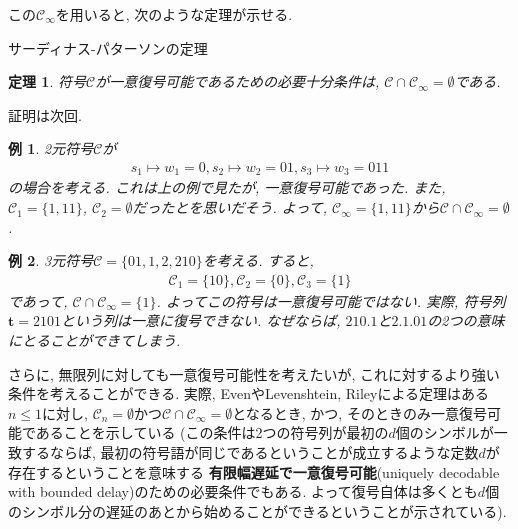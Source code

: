 \documentclass[12pt]{ltjsarticle}
\newtheorem{example}{例}
\newtheorem{theorem}{定理}
\begin{document}
この$\mathcal{C}_\infty$を用いると, 次のような定理が示せる.
\begin{itembox}[l]{サーディナス-パターソンの定理}
  \begin{theorem}
    符号$\mathcal{C}$が一意復号可能であるための必要十分条件は, $\mathcal{C} \cap \mathcal{C}_\infty = \emptyset$である.
  \end{theorem}
\end{itembox}
証明は次回.
\begin{example}
  2元符号$\mathcal{C}$が
  \begin{align*}
    s_1 \mapsto w_1 = 0, s_2 \mapsto w_2 = 01, s_3 \mapsto w_3 = 011
  \end{align*}
  の場合を考える.
  これは上の例で見たが, 一意復号可能であった.
  また, $\mathcal{C}_1 = \{1, 11\}$, $\mathcal{C}_2 = \emptyset$だったとを思いだそう.
  よって, $\mathcal{C}_\infty = \{1, 11\}$から$\mathcal{C} \cap \mathcal{C}_\infty = \emptyset$.
\end{example}
\begin{example}
  3元符号$\mathcal{C} = \{01, 1, 2, 210\}$を考える.
  すると,
  \begin{align*}
    \mathcal{C}_1 = \{10\}, \mathcal{C}_2 = \{0\}, \mathcal{C}_3 = \{1\}
  \end{align*}
  であって, $\mathcal{C} \cap \mathcal{C}_\infty = \{1\}$.
  よってこの符号は一意復号可能ではない.
  実際, 符号列$\boldsymbol{t} = 2101$という列は一意に復号できない.
  なぜならば, $210.1$と$2.1.01$の2つの意味にとることができてしまう.
\end{example}
さらに, 無限列に対しても一意復号可能性を考えたいが, これに対するより強い条件を考えることができる.
実際, Even\cite{even-63}やLevenshtein\cite{levenshtein-64}, Riley\cite{riley-67}による定理はある$n \leq 1$に対し,
$\mathcal{C}_n = \emptyset$かつ$\mathcal{C} \cap \mathcal{C}_\infty = \emptyset$となるとき,
かつ, そのときのみ一意復号可能であることを示している
(この条件は2つの符号列が最初の$d$個のシンボルが一致するならば,
最初の符号語が同じであるということが成立するような定数$d$が存在するということを意味する
\textbf{有限幅遅延で一意復号可能}(uniquely decodable with bounded delay)のための必要条件でもある.
よって復号自体は多くとも$d$個のシンボル分の遅延のあとから始めることができるということが示されている).

\printbibliography[title=参考文献]
\end{document}
